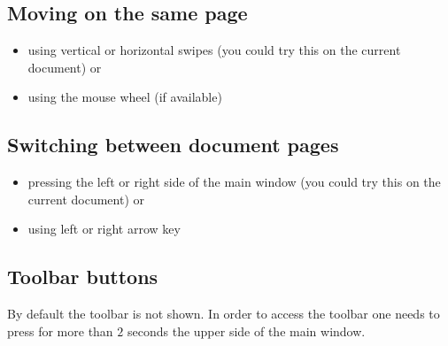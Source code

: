 \documentclass[journal,12pt]{IEEEtran}
\begin{document}
\subsection{Moving on the same page}
\begin{itemize}
 \item using vertical or horizontal swipes (you could try this on the current document) or
 \item using the mouse wheel (if available)
\end{itemize}

\subsection{Switching between document pages}
\begin{itemize}
 \item pressing the left or right side of the main window (you could try this on the current document) or
 \item using left or right arrow key
\end{itemize}

\subsection{Toolbar buttons}

By default the toolbar is not shown. In order to access the toolbar one needs to press for more than $2$ seconds the upper side of the main window. 
\end{document}

